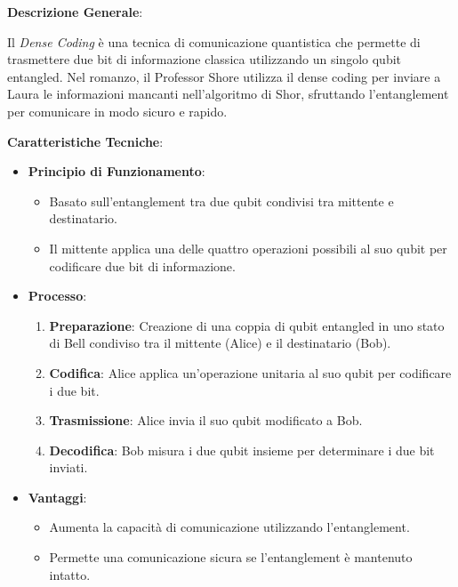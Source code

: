 \begin{tcolorbox}[fontupper=\footnotesize, fontlower=\Large,colback=white,colframe=black,title=\textbf{Dense Coding}]
\begin{multicols}{2}
\textbf{Descrizione Generale}:

Il \emph{Dense Coding} è una tecnica di comunicazione quantistica che permette di trasmettere due bit di informazione classica utilizzando un singolo qubit entangled. Nel romanzo, il Professor Shore utilizza il dense coding per inviare a Laura le informazioni mancanti nell'algoritmo di Shor, sfruttando l'entanglement per comunicare in modo sicuro e rapido.

\textbf{Caratteristiche Tecniche}:

\begin{itemize}
    \item \textbf{Principio di Funzionamento}:
    \begin{itemize}
        \item Basato sull'entanglement tra due qubit condivisi tra mittente e destinatario.
        \item Il mittente applica una delle quattro operazioni possibili al suo qubit per codificare due bit di informazione.
    \end{itemize}
    \item \textbf{Processo}:
    \begin{enumerate}
        \item \textbf{Preparazione}: Creazione di una coppia di qubit entangled in uno stato di Bell condiviso tra il mittente (Alice) e il destinatario (Bob).
        \item \textbf{Codifica}: Alice applica un'operazione unitaria al suo qubit per codificare i due bit.
        \item \textbf{Trasmissione}: Alice invia il suo qubit modificato a Bob.
        \item \textbf{Decodifica}: Bob misura i due qubit insieme per determinare i due bit inviati.
    \end{enumerate}
    \item \textbf{Vantaggi}:
    \begin{itemize}
        \item Aumenta la capacità di comunicazione utilizzando l'entanglement.
        \item Permette una comunicazione sicura se l'entanglement è mantenuto intatto.
    \end{itemize}
\end{itemize}


\end{multicols}
\end{tcolorbox}
